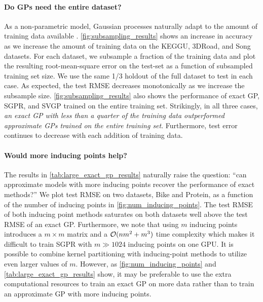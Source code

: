 \paragraph{Do GPs need the entire dataset?}
As a non-parametric model, Gaussian processes naturally adapt to the amount of training
data available \citep{wilson2014thesis}. \cref{fig:subsampling_results} shows an increase in accuracy as we increase the amount
of training data on the KEGGU, 3DRoad, and Song datasets. For each dataset, we
subsample a fraction of the training data and plot the resulting root-mean-square
error on the test-set as a function of subsampled training set size. We use the
same 1/3 holdout of the full dataset to test in each case.
As expected, the test RMSE decreases monotonically as we increase the subsample size.
\cref{fig:subsampling_results} also shows the
performance of exact GP, SGPR, and SVGP trained on the entire training set.
Strikingly, in all three cases, \textit{an exact GP with less than a quarter of
the training data outperformed approximate GPs trained on the entire
training set}. Furthermore, test error continues to decrease with each addition of training data.

\paragraph{Would more inducing points help?}
The results in \cref{tab:large_exact_gp_results} naturally raise the question: ``can approximate models with more inducing
points recover the performance of exact methods?''
We plot test RMSE on two datasets, Bike and Protein, as a function of the number of inducing points in \cref{fig:num_inducing_points}.
The test RMSE of both inducing point methods saturates on both datasets well above
the test RMSE of an exact GP.
Furthermore, we note that using $m$ inducing points introduces a $m \times m$
matrix and a $\bigo{nm^2 + m^3}$ time complexity
\cite{hensman2013gaussian,hensman2015scalable} which makes it
difficult to train SGPR with $m \gg 1024$ inducing points on
one GPU. It is possible to combine kernel partitioning with inducing-point methods to utilize even larger values of $m$.
However, as \cref{fig:num_inducing_points} and \cref{tab:large_exact_gp_results} show, it may be preferable
to use the extra computational resources to train an exact GP on more data rather than
to train an approximate GP with more inducing points.
%
